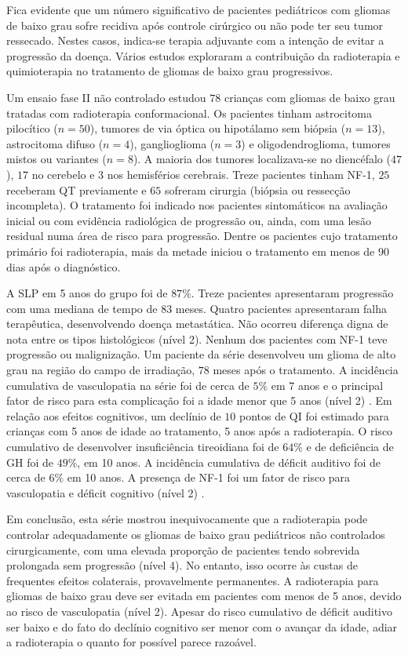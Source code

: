\documentclass[11pt,a4paper,oldfontcommands]{memoir}
\begin{document}
Fica evidente que um número significativo de pacientes pediátricos com gliomas de baixo grau sofre recidiva após controle cirúrgico ou não pode ter seu tumor ressecado. Nestes casos, indica-se terapia adjuvante com a intenção de evitar a progressão da doença. Vários estudos exploraram a contribuição da radioterapia e quimioterapia no tratamento de gliomas de baixo grau progressivos. 

Um ensaio fase II não controlado estudou \(78\) crianças com gliomas de baixo grau tratadas com radioterapia conformacional. Os pacientes tinham astrocitoma pilocítico (\(n=50\)), tumores de via óptica ou hipotálamo sem biópsia (\(n=13\)), astrocitoma difuso (\(n=4\)), ganglioglioma (\(n=3\)) e oligodendroglioma, tumores mistos ou variantes (\(n=8\)). A maioria dos tumores localizava-se no diencéfalo (\(47\)), \(17\) no cerebelo e \(3\) nos hemisférios cerebrais. Treze pacientes tinham NF-1, \(25\) receberam QT previamente e \(65\) sofreram cirurgia (biópsia ou ressecção incompleta). O tratamento foi indicado nos pacientes sintomáticos na avaliação inicial ou com evidência radiológica de progressão ou, ainda, com uma lesão residual numa área de risco para progressão. Dentre os pacientes cujo tratamento primário foi radioterapia, mais da metade iniciou o tratamento em menos de 90 dias após o diagnóstico. 

A SLP em 5 anos do grupo foi de \(87\%\). Treze pacientes apresentaram progressão com uma mediana de tempo de \(83\) meses. Quatro pacientes apresentaram falha terapêutica, desenvolvendo doença metastática. Não ocorreu diferença digna de nota entre os tipos histológicos (nível 2). Nenhum dos pacientes com NF-1 teve progressão ou malignização. Um paciente da série desenvolveu um glioma de alto grau na região do campo de irradiação, \(78\) meses após o tratamento. A incidência cumulativa de vasculopatia na série foi de cerca de \(5\%\) em 7 anos e o principal fator de risco para esta complicação foi a idade menor que 5 anos (nível 2) \cite{Merchant01082009}. Em relação aos efeitos cognitivos, um declínio de \(10\) pontos de QI foi estimado para crianças com 5 anos de idade ao tratamento, 5 anos após a radioterapia. O risco cumulativo de desenvolver insuficiência tireoidiana foi de \(64\%\) e de deficiência de GH foi de \(49\%\), em 10 anos. A incidência cumulativa de déficit auditivo foi de cerca de \(6\%\) em 10 anos. A presença de NF-1 foi um fator de risco para vasculopatia e déficit cognitivo (nível 2) \cite{Merchant01082009.2}. 

Em conclusão, esta série mostrou inequivocamente que a radioterapia pode controlar adequadamente os gliomas de baixo grau pediátricos não controlados cirurgicamente, com uma elevada proporção de pacientes tendo sobrevida prolongada sem progressão (nível 4). No entanto, isso ocorre às custas de frequentes efeitos colaterais, provavelmente permanentes. A radioterapia para gliomas de baixo grau deve ser evitada em pacientes com menos de 5 anos, devido ao risco de vasculopatia (nível 2). Apesar do risco cumulativo de déficit auditivo ser baixo e do fato do declínio cognitivo ser menor com o avançar da idade, adiar a radioterapia o quanto for possível parece razoável.
\end{document}

